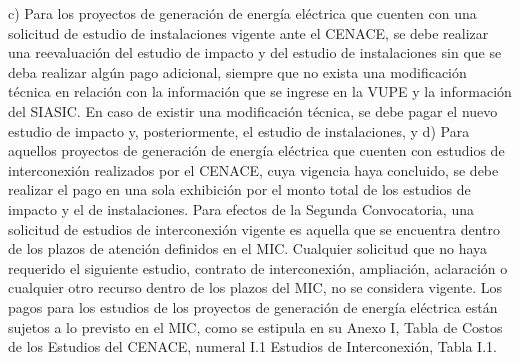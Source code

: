 c) Para los proyectos de generación de energía eléctrica que cuenten con una solicitud de estudio de instalaciones vigente ante el CENACE, se debe realizar una reevaluación del estudio de impacto y del estudio de instalaciones sin que se deba realizar algún pago adicional, siempre que no exista una modificación técnica en relación con la información que se ingrese en la VUPE y la información del SIASIC. En caso de existir una modificación técnica, se debe pagar el nuevo estudio de impacto y, posteriormente, el estudio de instalaciones, y
d) Para aquellos proyectos de generación de energía eléctrica que cuenten con estudios de interconexión realizados por el CENACE, cuya vigencia haya concluido, se debe realizar el pago en una sola exhibición por el monto total de los estudios de impacto y el de instalaciones.
Para efectos de la Segunda Convocatoria, una solicitud de estudios de interconexión vigente es aquella que se encuentra dentro de los plazos de atención definidos en el MIC. Cualquier solicitud que no haya requerido el siguiente estudio, contrato de interconexión, ampliación, aclaración o cualquier otro recurso dentro de los plazos del MIC, no se considera vigente.
Los pagos para los estudios de los proyectos de generación de energía eléctrica están sujetos a lo previsto en el MIC, como se estipula en su Anexo I, Tabla de Costos de los Estudios del CENACE, numeral I.1 Estudios de Interconexión, Tabla I.1.


